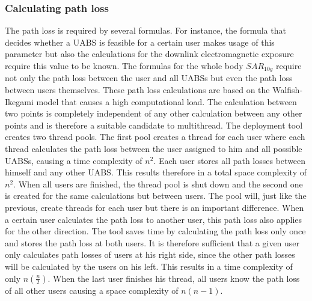 \subsubsection{Calculating path loss}
The path loss is required by several formulas. For instance, the formula that decides whether a \gls{UABS} is feasible for a certain 
user makes usage of this parameter but also the calculations for the downlink electromagnetic 
exposure require this value to be known. The formulas for the whole body $SAR_{10g}$ require not only the path loss between the user
and all \gls{UABS}s but even the path loss between users themselves. These path loss calculations are based on the Walfish-Ikegami 
model that causes a high computational load.  The calculation between two points is completely independent of any other calculation between any 
other points and is therefore a suitable candidate to multithread.
 The deployment tool creates two thread pools.
The first pool creates a thread for each user where each thread calculates the path loss between the user assigned to him and all possible \gls{UABS}s,
causing a time complexity of $n^2$.
Each user stores all path losses between himself and any other \gls{UABS}. This results therefore in a total space complexity of $n^2$.
When all users are finished, the thread pool is shut down and the second one is created for the same calculations but between users.
The pool will, just like the previous, create threads for each user but there is an important difference.
When a certain user calculates the path loss to another user, this path loss also applies for the other direction. The tool saves time by calculating the path loss only 
once and stores the path loss at both users. It is therefore sufficient that a given user only calculates path losses of users at his right side, since the other path losses will 
be calculated by the users on his left. This results in a time complexity of only $n(\frac{n}{2})$. When the last user finishes his thread, all users know the path loss of all other users causing 
a space complexity of $n(n-1)$.

